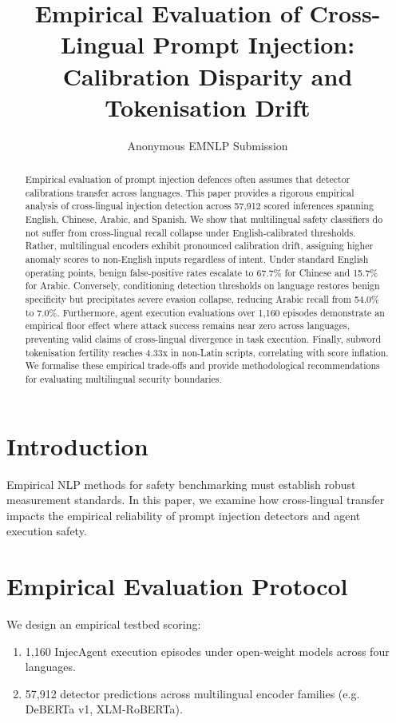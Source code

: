 \documentclass[11pt]{article}
\title{Empirical Evaluation of Cross-Lingual Prompt Injection: Calibration Disparity and Tokenisation Drift}
\author{Anonymous EMNLP Submission}
\begin{document}
\maketitle

\begin{abstract}
Empirical evaluation of prompt injection defences often assumes that detector calibrations transfer across languages. This paper provides a rigorous empirical analysis of cross-lingual injection detection across 57,912 scored inferences spanning English, Chinese, Arabic, and Spanish. We show that multilingual safety classifiers do not suffer from cross-lingual recall collapse under English-calibrated thresholds. Rather, multilingual encoders exhibit pronounced calibration drift, assigning higher anomaly scores to non-English inputs regardless of intent. Under standard English operating points, benign false-positive rates escalate to 67.7\% for Chinese and 15.7\% for Arabic. Conversely, conditioning detection thresholds on language restores benign specificity but precipitates severe evasion collapse, reducing Arabic recall from 54.0\% to 7.0\%. Furthermore, agent execution evaluations over 1,160 episodes demonstrate an empirical floor effect where attack success remains near zero across languages, preventing valid claims of cross-lingual divergence in task execution. Finally, subword tokenisation fertility reaches 4.33x in non-Latin scripts, correlating with score inflation. We formalise these empirical trade-offs and provide methodological recommendations for evaluating multilingual security boundaries.
\end{abstract}

\section{Introduction}
Empirical NLP methods for safety benchmarking must establish robust measurement standards. In this paper, we examine how cross-lingual transfer impacts the empirical reliability of prompt injection detectors and agent execution safety.

\section{Empirical Evaluation Protocol}
We design an empirical testbed scoring:
\begin{enumerate}
    \item 1,160 InjecAgent execution episodes under open-weight models across four languages.
    \item 57,912 detector predictions across multilingual encoder families (e.g. DeBERTa v1, XLM-RoBERTa).
\end{enumerate}
\end{document}
